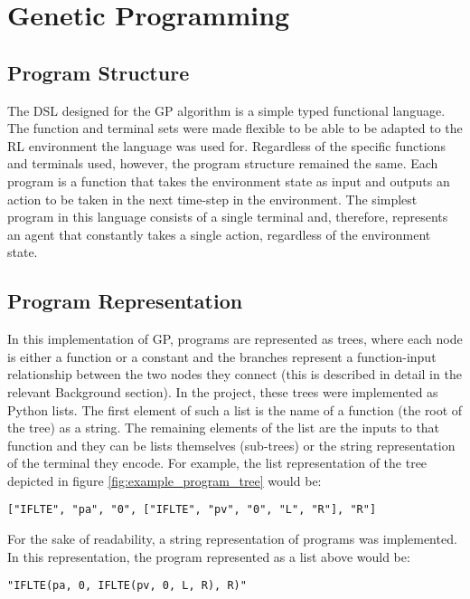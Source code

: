 
\section{Genetic Programming}
\subsection{Program Structure}
The DSL designed for the GP algorithm is a simple typed functional language. The function and terminal sets were made flexible to be able to be adapted to the RL environment the language was used for. Regardless of the specific functions and terminals used, however, the program structure remained the same. Each program is a function that takes the environment state as input and outputs an action to be taken in the next time-step in the environment. The simplest program in this language consists of a single terminal and, therefore, represents an agent that constantly takes a single action, regardless of the environment state. 

\subsection{Program Representation}
In this implementation of GP, programs are represented as trees, where each node is either a function or a constant and the branches represent a function-input relationship between the two nodes they connect (this is described in detail in the relevant Background section). In the project, these trees were implemented as Python lists. The first element of such a list is the name of a function (the root of the tree) as a string. The remaining elements of the list are the inputs to that function and they can be lists themselves (sub-trees) or the string representation of the terminal they encode. For example, the list representation of the tree depicted in figure \ref{fig:example_program_tree} would be:

\begin{verbatim}
["IFLTE", "pa", "0", ["IFLTE", "pv", "0", "L", "R"], "R"]
\end{verbatim}

For the sake of readability, a string representation of programs was implemented. In this representation, the program represented as a list above would be:

\begin{verbatim}
"IFLTE(pa, 0, IFLTE(pv, 0, L, R), R)"
\end{verbatim}

